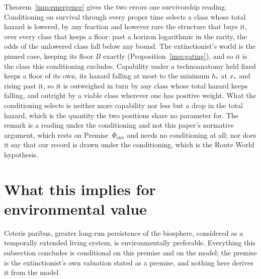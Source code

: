 \begin{remark}\label{hr:rem:emergence}
Theorem~\ref{imp:emergence} gives the two errors one survivorship
reading. Conditioning on survival through every proper time selects a
class whose total hazard is lowered, by any fraction and however rare
the structure that buys it, over every class that keeps a floor: past a
horizon logarithmic in the rarity, the odds of the unlowered class fall
below any bound. The extinctionist's world is the pinned case, keeping
its floor $B$ exactly (Proposition~\ref{imp:gating}), and so it
is the class this conditioning excludes. Capability under a technoanatomy held
fixed keeps a floor of its own, its hazard falling at most to the
minimum $h_\ast$ at $x_\ast$ and rising past it, so it is outweighed in
turn by any class whose total hazard keeps falling, and outright by a
viable class wherever one has positive weight. What the
conditioning selects is neither more capability nor less but a drop in
the total hazard, which is the quantity the two positions share no
parameter for. The remark is a reading under the conditioning and not
this paper's normative argument, which rests on
Premise~$\Phi_{\mathrm{env}}$ and needs no conditioning at all; nor does
it say that our record is drawn under the conditioning, which is the
Route World hypothesis.
\end{remark}


\section{What this implies for environmental value}\label{sec:environment}

\label{hr:sub:environment}

\begin{premise}\label{hr:prem:env}
Ceteris paribus, greater long-run persistence of the biosphere,
considered as a temporally extended living system, is environmentally
preferable. Everything this subsection concludes is conditional on this
premise and on the model; the premise is the extinctionist's own
valuation stated as a premise, and nothing here derives it from the
model.
\end{premise}

